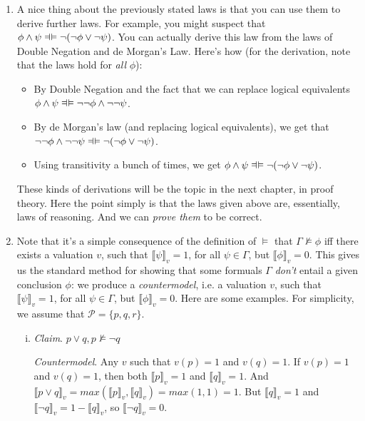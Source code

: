 \begin{enumerate}[\thesection.1]
		\item A nice thing about the previously stated laws is that you can use them to derive further laws. For example, you might suspect that $\phi\land\psi\equi \neg(\neg\phi\lor\neg \psi)$. You can actually derive this law from the laws of Double Negation and de Morgan's Law. Here's how (for the derivation, note that the laws hold for \emph{all} $\phi$):
		\begin{itemize}
		
			\item By Double Negation and the fact that we can replace logical equivalents $\phi\land\psi\equi \neg\neg\phi\land\neg\neg\psi$. 			
			\item By de Morgan's law (and replacing logical equivalents), we get that $ \neg\neg\phi\land\neg\neg\psi\equi \neg(\neg\phi\lor\neg\psi)$.
					
			\item Using transitivity a bunch of times, we get  $\phi\land\psi\equi\neg(\neg\phi\lor\neg\psi)$.		
		\end{itemize}
		These kinds of derivations will be the topic in the next chapter, in proof theory. Here the point simply is that the laws given above are, essentially, laws of reasoning. And we can \emph{prove them} to be correct. 
				
		\item Note that it's a simple consequence of the definition of $\vDash$
			that $\Gamma\nvDash\phi$ iff there exists a valuation $v$, such that
			$\llbracket\psi\rrbracket_v=1$, for all $\psi\in\Gamma$, but
			$\llbracket\phi\rrbracket_v=0$. This gives us the standard method for
			showing that some formuals $\Gamma$ \emph{don't} entail a given
			conclusion $\phi$: we produce a \emph{countermodel}, i.e. a valuation
			$v$, such that $\llbracket\psi\rrbracket_v=1$, for all $\psi\in\Gamma$,
			but $\llbracket\phi\rrbracket_v=0$. Here are some examples. For
			simplicity, we assume that $\mathcal{P}=\{p,q,r\}$.
		
		\begin{enumerate}[(i)]
		
			\item \emph{Claim}. $p\lor q, p\nvDash \neg q$
			
			\emph{Countermodel}. Any $v$ such that $v(p)=1$ and $v(q)=1$. If $v(p)=1$
			and $v(q)=1$, then both $\llbracket p\rrbracket_v=1$ and $\llbracket
			q\rrbracket_v=1$. And $\llbracket p\lor q\rrbracket_v=max(\llbracket
			p\rrbracket_v,\llbracket q\rrbracket_v)=max(1, 1)=1$. But $\llbracket
			q\rrbracket_v=1$ and $\llbracket \neg q\rrbracket_v=1-\llbracket
			q\rrbracket_v$, so $\llbracket \neg q\rrbracket_v=0$.
		

\end{enumerate}
\end{enumerate}
